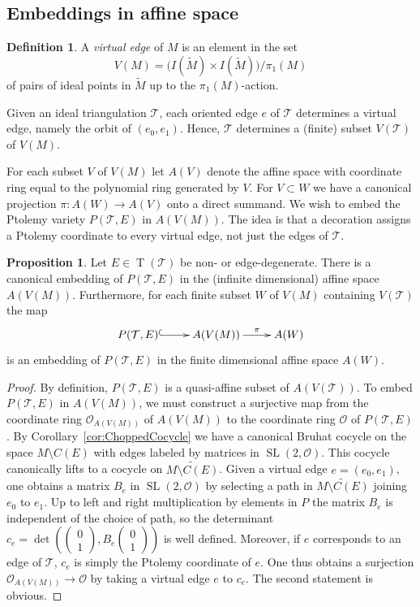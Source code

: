 \documentclass[11pt]{amsart}
\theoremstyle{plain}
\theoremstyle{definition}
\newtheorem{proposition}[theorem]{Proposition}
\newtheorem{definition}[theorem]{Definition}
\numberwithin{equation}{section}
\newcommand{\T}{\mathcal T}
\newcommand{\Vector}[2]{\left(\begin{smallmatrix}#1\\#2\end{smallmatrix}\right)}
\DeclareMathOperator{\SL}{SL}
\DeclareMathOperator{\TE}{T}
\begin{document}
\subsection{Embeddings in affine space}
\begin{definition}\label{def:VirtualEdges}
A \emph{virtual edge} of $M$ is an element in the set
\begin{equation}
V(M) =\big(I(\widetilde M)\times I(\widetilde M)\big)\big/\pi_1(M)
\end{equation}
of pairs of ideal points in $\widetilde M$ up to the $\pi_1(M)$-action. 
\end{definition}
Given an ideal triangulation $\T$, each oriented edge $e$ of $\T$ determines a virtual edge, namely the orbit of $(e_0,e_1)$. 
Hence, $\T$ determines a (finite) subset $V(\T)$ of $V(M)$.

For each subset $V$ of $V(M)$ let $A(V)$ denote the affine space with coordinate ring equal to the polynomial ring generated by $V$.  For $V\subset W$ we have a canonical projection $\pi\colon A(W)\to A(V)$ onto a direct summand. 
We wish to embed the Ptolemy variety $P(\T,E)$ in $A(V(M))$. The idea is that a decoration assigns a Ptolemy coordinate to every virtual edge, not just the edges of $\T$.

\begin{proposition}\label{prop:Embeddings} Let $E\in\TE(\T)$ be non- or edge-degenerate. There is a canonical embedding of $P(\T,E)$ in the (infinite dimensional) affine space $A(V(M))$. Furthermore, for each finite subset $W$ of $V(M)$ containing $V(\T)$ the map
\begin{equation}
\xymatrix{P(\T,E)\ar@{^{(}->}[r]&A(V(M))\ar[r]^-\pi&A(W)}
\end{equation} 
is an embedding of $P(\T,E)$ in the finite dimensional affine space $A(W)$.
\end{proposition}
\begin{proof}
By definition, $P(\T,E)$ is a quasi-affine subset of $A(V(\T))$. To embed $P(\T,E)$ in $A(V(M))$, we must construct a surjective map from the coordinate ring $\mathcal O_{A(V(M))}$ of $A(V(M))$ to the coordinate ring $\mathcal O$ of $P(\T,E)$. 
By Corollary~\ref{cor:ChoppedCocycle} we have a canonical Bruhat cocycle on the space $M\setminus C(E)$ with edges labeled by matrices in $\SL(2,\mathcal O)$. This cocycle canonically lifts to a cocycle on $\widetilde{M\setminus C(E)}$. Given a virtual edge $e=(e_0,e_1)$, one obtains a matrix $B_e$ in $\SL(2,\mathcal O)$ by selecting a path in $\widetilde{M\setminus C(E)}$ joining $e_0$ to $e_1$. Up to left and right multiplication by elements in $P$ the matrix $B_e$ is independent of the choice of path, so the determinant $c_e=\det(\Vector{0}{1},B_e\Vector{0}{1})$ 
is well defined. Moreover, if $e$ corresponds to an edge of $\T$, $c_e$ is simply the Ptolemy coordinate of $e$. One thus obtains a surjection $\mathcal O_{A(V(M))}\to\mathcal O$ by taking a virtual edge $e$ to $c_e$.
The second statement is obvious.
\end{proof}
\end{document}
